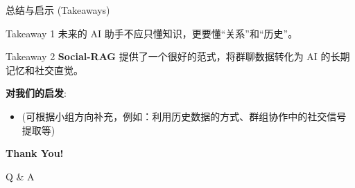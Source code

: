\documentclass[aspectratio=169]{beamer}
\begin{document}
\begin{frame}{总结与启示 (Takeaways)}
    \begin{block}{Takeaway 1}
        未来的 AI 助手不应只懂知识，更要懂“关系”和“历史”。
    \end{block}
    
    \begin{block}{Takeaway 2}
        \textbf{Social-RAG} 提供了一个很好的范式，将群聊数据转化为 AI 的长期记忆和社交直觉。
    \end{block}
    
    \vspace{0.5cm}
    \textbf{对我们的启发}:
    \begin{itemize}
        \item (可根据小组方向补充，例如：利用历史数据的方式、群组协作中的社交信号提取等)
    \end{itemize}
\end{frame}

\begin{frame}
    \begin{center}
        \Huge \textbf{Thank You!}
        
        \vspace{1cm}
        \Large Q \& A
    \end{center}
\end{frame}
\end{document}
